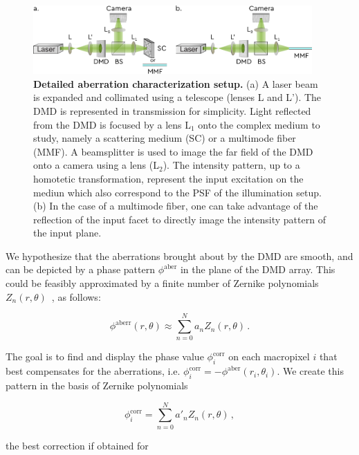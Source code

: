 \documentclass[12pt]{iopart}
\begin{document}
\begin{figure}
  \centering
  \includegraphics[width = 0.95\textwidth]{images/aberr_setup.pdf}
  \caption{
    \textbf{Detailed aberration characterization setup.}
    (a) A laser beam is expanded and collimated using a telescope (lenses L and L').
    The DMD is represented in transmission for simplicity.
    Light reflected from the DMD is focused by a lens L$_\text{1}$
    onto the complex medium to study, namely a scattering medium (SC)
    or a multimode fiber (MMF).
    A beamsplitter is used to image the far field of the DMD onto a camera
    using a lens (L$_\text{2}$).
    The intensity pattern, up to a homotetic transformation,
    represent the input excitation on the mediun
    which also correspond to the PSF of the illumination setup.
    (b) In the case of a multimode fiber,
    one can take advantage of the reflection of the input facet
    to directly image the intensity pattern of the input plane.
  }
  \label{fig:dmd_aberr_setup2}
\end{figure}

We hypothesize that the aberrations brought about by the DMD are smooth,
and can be depicted by a phase pattern $\phi^\text{aber}$ in the plane of the DMD array.
This could be feasibly approximated by a finite number of Zernike polynomials
$Z_n(r,\theta)$~\cite{Zernike1934beugungstheorie}, as follows:



\begin{equation}
  \phi^\text{aberr}(r,\theta) \approx \sum_{n=0}^N a_n Z_n(r,\theta) \, .
\end{equation}

The goal is to find and display the phase value
$\phi_i^\text{corr}$ on each macropixel $i$ that best compensates for the aberrations,
i.e. $\phi_i^\text{corr} = -\phi^\text{aber}(r_i,\theta_i)$.
We create this pattern in the basis of Zernike polynomials

\begin{equation}
  \phi_i^\text{corr} = \sum_{n=0}^N a'_n Z_n(r,\theta) \, ,
\end{equation}

the best correction if obtained for
\end{document}
